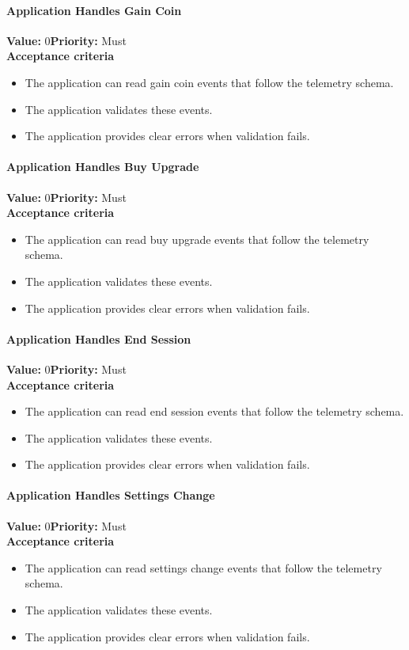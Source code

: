 \paragraph{Application Handles Gain Coin}
\textbf{Value:} 0\quad \textbf{Priority:} Must\\
\textbf{Acceptance criteria}
\begin{itemize}
  \item The application can read gain coin events that follow the telemetry schema.
  \item The application validates these events.
  \item The application provides clear errors when validation fails.
\end{itemize}

\paragraph{Application Handles Buy Upgrade}
\textbf{Value:} 0\quad \textbf{Priority:} Must\\
\textbf{Acceptance criteria}
\begin{itemize}
  \item The application can read buy upgrade events that follow the telemetry schema.
  \item The application validates these events.
  \item The application provides clear errors when validation fails.
\end{itemize}

\paragraph{Application Handles End Session}
\textbf{Value:} 0\quad \textbf{Priority:} Must\\
\textbf{Acceptance criteria}
\begin{itemize}
  \item The application can read end session events that follow the telemetry schema.
  \item The application validates these events.
  \item The application provides clear errors when validation fails.
\end{itemize}

\paragraph{Application Handles Settings Change}
\textbf{Value:} 0\quad \textbf{Priority:} Must\\
\textbf{Acceptance criteria}
\begin{itemize}
  \item The application can read settings change events that follow the telemetry schema.
  \item The application validates these events.
  \item The application provides clear errors when validation fails.
\end{itemize}


